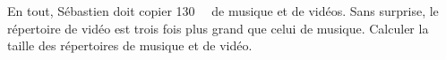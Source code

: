 
\begin{exercice}\label{exo2smath-0243}

    En tout, Sébastien doit copier \SI{130}{\giga\byte} de musique et de vidéos. Sans surprise, le répertoire de vidéo est trois fois plus grand que celui de musique. Calculer la taille des répertoires de musique et de vidéo.

\end{exercice}
